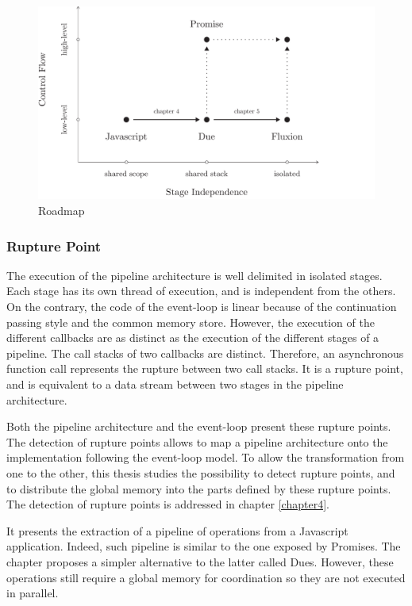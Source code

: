 \begin{figure}[h!]
\includegraphics[width=1\textwidth]{../ressources/roadmap.pdf}
\caption{Roadmap}
\label{fig:chapter3:objectives:roadmap}
\end{figure}

\subsubsection{Rupture Point}

The execution of the pipeline architecture is well delimited in isolated stages.
Each stage has its own thread of execution, and is independent from the others.
On the contrary, the code of the event-loop is linear because of the continuation passing style and the common memory store.
However, the execution of the different callbacks are as distinct as the execution of the different stages of a pipeline.
The call stacks of two callbacks are distinct.
Therefore, an asynchronous function call represents the rupture between two call stacks.
It is a rupture point, and is equivalent to a data stream between two stages in the pipeline architecture.

Both the pipeline architecture and the event-loop present these rupture points.
The detection of rupture points allows to map a pipeline architecture onto the implementation following the event-loop model.
To allow the transformation from one to the other, this thesis studies the possibility to detect rupture points, and to distribute the global memory into the parts defined by these rupture points.
The detection of rupture points is addressed in chapter \ref{chapter4}.

It presents the extraction of a pipeline of operations from a Javascript application.
Indeed, such pipeline is similar to the one exposed by Promises.
The chapter proposes a simpler alternative to the latter called Dues.
However, these operations still require a global memory for coordination so they are not executed in parallel.

